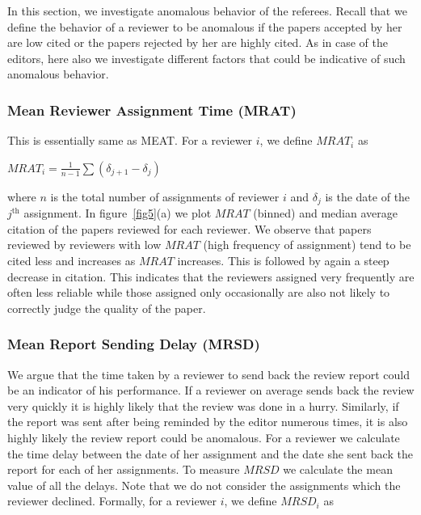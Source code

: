 In this section, we investigate anomalous behavior of the referees. Recall that we define the behavior of a reviewer to be anomalous if the papers accepted by her are low cited or the papers rejected by her are highly cited. As in case of the editors, here also we investigate different factors that could be indicative of such anomalous behavior.  

\subsubsection{Mean Reviewer Assignment Time (MRAT)}

This is essentially same as MEAT. For a reviewer $i$, we define $MRAT_{i}$ as
\begin{center}
$MRAT_{i}=\frac{1}{n-1}\sum (\delta_{j+1} - \delta_{j})$
\end{center}
\noindent where $n$ is the total number of assignments of reviewer $i$ and $\delta_{j}$ is the date of the $j^\textrm{th}$ assignment. In figure~\ref{fig5}(a) we plot $MRAT$ (binned) and median average citation of the papers reviewed for each reviewer. We observe that papers reviewed by reviewers with low $MRAT$ (high frequency of assignment) tend to be cited less and increases as $MRAT$ increases. This is followed by again a steep decrease in citation. This indicates that the reviewers assigned very frequently are often less reliable while those assigned only occasionally are also not likely to correctly judge the quality of the paper.  

\subsubsection{Mean Report Sending Delay (MRSD)}

We argue that the time taken by a reviewer to send back the review report could be an indicator of his performance. If a reviewer on average sends back the review very quickly it is highly likely that the review was done in a hurry. Similarly, if the report was sent after being reminded by the editor numerous times, it is also highly likely the review report could be anomalous. For a reviewer we calculate the time delay between the date of her assignment and the date she sent back the report for each of her assignments. To measure $MRSD$ we calculate the mean value of all the delays. Note that we do not consider the assignments which the reviewer declined. Formally, for a reviewer $i$, we define $MRSD_{i}$ as 


